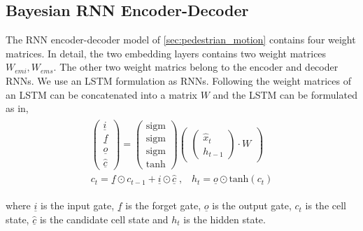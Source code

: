 \subsection{Bayesian RNN Encoder-Decoder}
The RNN encoder-decoder model of \autoref{sec:pedestrian_motion} contains four weight matrices. In detail, the two embedding layers contains two weight matrices $W_{emi},W_{ems}$. The other two weight matrics belong to the encoder and decoder RNNs. We use an LSTM formulation as RNNs. Following \cite{graves2013speech} the weight matrices of an LSTM can be concatenated into a matrix $W$ and the LSTM can be formulated as in, 
\begin{align}\label{eq7}
    \begin{split}
        \begin{pmatrix} \underline{i} \\ \underline{f} \\ \underline{o} \\ \hat{\underline{c}} \end{pmatrix}
        = \begin{pmatrix} \text{sigm} \\ \text{sigm} \\ \text{sigm} \\ \text{tanh} \end{pmatrix}
        \begin{pmatrix} {\begin{pmatrix} \hat{x}_{t} \\ h_{t - 1}  \end{pmatrix}} \cdot W \end{pmatrix}\\
        c_{t} = \underline{f} \odot c_{t-1} + \underline{i} \odot \hat{\underline{c}}\;, \;\;\; h_{t} = \underline{o} \odot \text{tanh}(c_{t})
    \end{split}
\end{align}


where ${\underline{i}}$ is the input gate, ${\underline{f}}$ is the forget gate, ${\underline{o}}$ is the output gate, ${c_{t}}$ is the cell state, ${\hat{\underline{c}}}$ is the candidate cell state and ${h_{t}}$ is the hidden state. 


